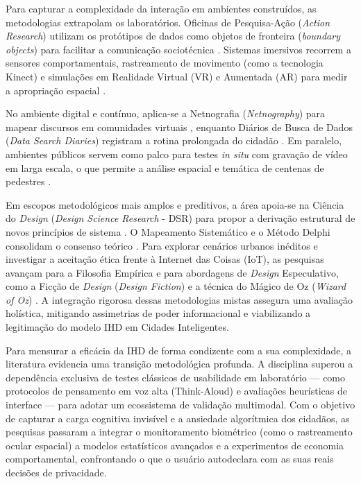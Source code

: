 \documentclass[
	12pt,				%
	oneside,			%
	a4paper,			%
	english,			%
	brazil				%
	]{abntex2ppgsi}
\begin{document}
    Para capturar a complexidade da interação em ambientes construídos, as metodologias extrapolam os laboratórios. Oficinas de Pesquisa-Ação (\textit{Action Research}) utilizam os protótipos de dados como objetos de fronteira (\textit{boundary objects}) para facilitar a comunicação sociotécnica \cite{seidelin2020foregrounding}. Sistemas imersivos recorrem a sensores comportamentais, rastreamento de movimento (como a tecnologia Kinect) e simulações em Realidade Virtual (VR) e Aumentada (AR) para medir a apropriação espacial \cite{bavaresco2019technological, casado2022sonification}.
    
    No ambiente digital e contínuo, aplica-se a Netnografia (\textit{Netnography}) para mapear discursos em comunidades virtuais \cite{Parviainen2016}, enquanto Diários de Busca de Dados (\textit{Data Search Diaries}) registram a rotina prolongada do cidadão \cite{Haghighati2020}. Em paralelo, ambientes públicos servem como palco para testes \textit{in situ} com gravação de vídeo em larga escala, o que permite a análise espacial e temática de centenas de pedestres \cite{Alhakamy2021, Trajkova2020}.
    
    Em escopos metodológicos mais amplos e preditivos, a área apoia-se na Ciência do \textit{Design} (\textit{Design Science Research} - DSR) para propor a derivação estrutural de novos princípios de sistema \cite{angelopoulos2021stewardship}. O Mapeamento Sistemático e o Método Delphi consolidam o consenso teórico \cite{Zou2020769}. Para explorar cenários urbanos inéditos e investigar a aceitação ética frente à Internet das Coisas (IoT), as pesquisas avançam para a Filosofia Empírica \cite{Lee-Smith2020} e para abordagens de \textit{Design} Especulativo, como a Ficção de \textit{Design} (\textit{Design Fiction}) e a técnica do Mágico de Oz (\textit{Wizard of Oz}) \cite{Kurze2023, mortier2015humandatainteractionhumanface}. A integração rigorosa dessas metodologias mistas assegura uma avaliação holística, mitigando assimetrias de poder informacional e viabilizando a legitimação do modelo IHD em Cidades Inteligentes.

    Para mensurar a eficácia da IHD de forma condizente com a sua complexidade, a literatura evidencia uma transição metodológica profunda. A disciplina superou a dependência exclusiva de testes clássicos de usabilidade em laboratório — como protocolos de pensamento em voz alta (Think-Aloud) e avaliações heurísticas de interface — para adotar um ecossistema de validação multimodal. Com o objetivo de capturar a carga cognitiva invisível e a ansiedade algorítmica dos cidadãos, as pesquisas passaram a integrar o monitoramento biométrico (como o rastreamento ocular espacial) a modelos estatísticos avançados e a experimentos de economia comportamental, confrontando o que o usuário autodeclara com as suas reais decisões de privacidade.
\end{document}
